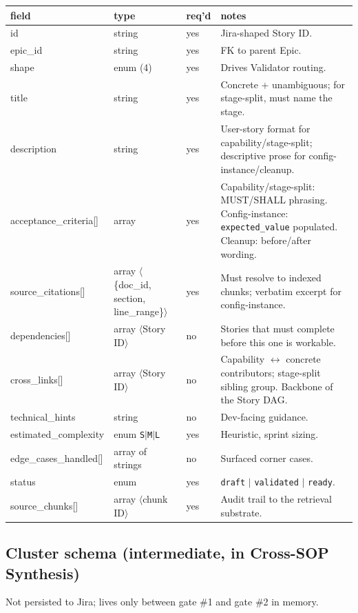 \documentclass[10pt,letterpaper]{article}
\begin{document}
\begin{tabularx}{\textwidth}{@{}>{\ttfamily}p{3.4cm}p{3.0cm}p{1.2cm}X@{}}
\toprule
\textbf{field} & \textbf{type} & \textbf{req'd} & \textbf{notes} \\
\midrule
id & string & yes & Jira-shaped Story ID. \\
epic\_id & string & yes & FK to parent Epic. \\
shape & enum (4) & yes & Drives Validator routing. \\
title & string & yes & Concrete + unambiguous; for stage-split, must name the stage. \\
description & string & yes & User-story format for capability/stage-split; descriptive prose for config-instance/cleanup. \\
acceptance\_criteria[] & array & yes & Capability/stage-split: MUST/SHALL phrasing. Config-instance: \texttt{expected\_value} populated. Cleanup: before/after wording. \\
source\_citations[] & array $\langle$\{doc\_id, section, line\_range\}$\rangle$ & yes & Must resolve to indexed chunks; verbatim excerpt for config-instance. \\
dependencies[] & array $\langle$Story ID$\rangle$ & no & Stories that must complete before this one is workable. \\
cross\_links[] & array $\langle$Story ID$\rangle$ & no & Capability $\leftrightarrow$ concrete contributors; stage-split sibling group. Backbone of the Story DAG. \\
technical\_hints & string & no & Dev-facing guidance. \\
estimated\_complexity & enum \texttt{S}$|$\texttt{M}$|$\texttt{L} & yes & Heuristic, sprint sizing. \\
edge\_cases\_handled[] & array of strings & no & Surfaced corner cases. \\
status & enum & yes & \texttt{draft} $|$ \texttt{validated} $|$ \texttt{ready}. \\
source\_chunks[] & array $\langle$chunk ID$\rangle$ & yes & Audit trail to the retrieval substrate. \\
\bottomrule
\end{tabularx}

\subsection{Cluster schema (intermediate, in Cross-SOP Synthesis)}

Not persisted to Jira; lives only between gate \#1 and gate \#2 in memory.
\end{document}
